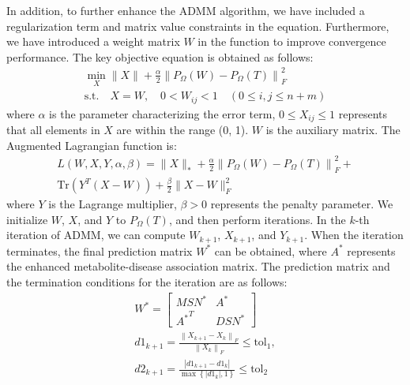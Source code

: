 \documentclass[lettersize,journal]{IEEEtran}
\begin{document}
In addition, to further enhance the ADMM algorithm, we have included a regularization term and matrix value constraints in the equation. Furthermore, we have introduced a weight matrix \( W \) in the function to improve convergence performance. The key objective equation is obtained as follows:
\begin{equation}
	\begin{aligned}
		\min_X \|X\| + \frac{\alpha}{2} \left\| P_{\Omega}(W) - P_{\Omega}(T) \right\|_F^2 \\
		\text{s.t.} \quad X = W, \quad 0 < W_{ij} < 1 \quad (0 \leq i, j \leq n+m)
	\end{aligned}
\end{equation}
where \( \alpha \) is the parameter characterizing the error term, \( 0 \leq X_{ij} \leq 1 \) represents that all elements in \( X \) are within the range (0, 1). \( W \) is the auxiliary matrix. The Augmented Lagrangian function is:
\begin{equation}
	\begin{aligned}
	L(W, X, Y, \alpha, \beta) = \|X\|_* + \frac{\alpha}{2} \left\| P_{\Omega}(W) - P_{\Omega}(T) \right\|_F^2 + \\
	\text{Tr}(Y^T (X - W)) +\frac{\beta}{2} \|X - W\|_F^2
	\end{aligned}
\end{equation}
where \( Y \) is the Lagrange multiplier, \( \beta > 0 \) represents the penalty parameter. We initialize \( W \), \( X \), and \( Y \) to \( P_{\Omega}(T) \), and then perform iterations. In the \(k\)-th iteration of ADMM, we can compute \( W_{k+1} \), \( X_{k+1} \), and \( Y_{k+1} \). When the iteration terminates, the final prediction matrix \( W^* \) can be obtained, where \( A^* \) represents the enhanced metabolite-disease association matrix. The prediction matrix and the termination conditions for the iteration are as follows:
\begin{equation}
	\begin{aligned}
	W^* = \begin{bmatrix} MSN^* & A^* \\ {A^*}^T & DSN^* \end{bmatrix}	\\
	d1_{k+1} = \frac{\left\| X_{k+1} - X_k \right\|_F}{\left\| X_k \right\|_F} \leq \text{tol}_1 ,\\
	d2_{ k+1} = \frac{\left| d1_{ k+1} - d1_{ k} \right|}{\max\left\{ \left| d1_{ k} \right|, 1 \right\}} \leq \text{tol}_2
	\end{aligned}
\end{equation}
\end{document}

